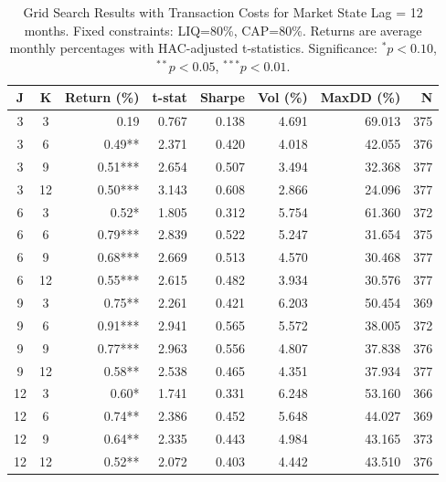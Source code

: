\begin{table}[htbp]
\caption{Grid Search Results with Transaction Costs for Market State Lag = 12 months. Fixed constraints: LIQ=80\%, CAP=80\%. Returns are average monthly percentages with HAC-adjusted t-statistics. Significance: $^{*}p<0.10$, $^{**}p<0.05$, $^{***}p<0.01$.}
\label{tab:grid_costs_lag12}
\begin{tabular}{cc|rrrrrr}
\toprule
J & K & Return (\%) & t-stat & Sharpe & Vol (\%) & MaxDD (\%) & N \\
\midrule
3 & 3 & 0.19 & 0.767 & 0.138 & 4.691 & 69.013 & 375 \\
3 & 6 & 0.49** & 2.371 & 0.420 & 4.018 & 42.055 & 376 \\
3 & 9 & 0.51*** & 2.654 & 0.507 & 3.494 & 32.368 & 377 \\
3 & 12 & 0.50*** & 3.143 & 0.608 & 2.866 & 24.096 & 377 \\
6 & 3 & 0.52* & 1.805 & 0.312 & 5.754 & 61.360 & 372 \\
6 & 6 & 0.79*** & 2.839 & 0.522 & 5.247 & 31.654 & 375 \\
6 & 9 & 0.68*** & 2.669 & 0.513 & 4.570 & 30.468 & 377 \\
6 & 12 & 0.55*** & 2.615 & 0.482 & 3.934 & 30.576 & 377 \\
9 & 3 & 0.75** & 2.261 & 0.421 & 6.203 & 50.454 & 369 \\
9 & 6 & 0.91*** & 2.941 & 0.565 & 5.572 & 38.005 & 372 \\
9 & 9 & 0.77*** & 2.963 & 0.556 & 4.807 & 37.838 & 376 \\
9 & 12 & 0.58** & 2.538 & 0.465 & 4.351 & 37.934 & 377 \\
12 & 3 & 0.60* & 1.741 & 0.331 & 6.248 & 53.160 & 366 \\
12 & 6 & 0.74** & 2.386 & 0.452 & 5.648 & 44.027 & 369 \\
12 & 9 & 0.64** & 2.335 & 0.443 & 4.984 & 43.165 & 373 \\
12 & 12 & 0.52** & 2.072 & 0.403 & 4.442 & 43.510 & 376 \\
\bottomrule
\end{tabular}
\end{table}
